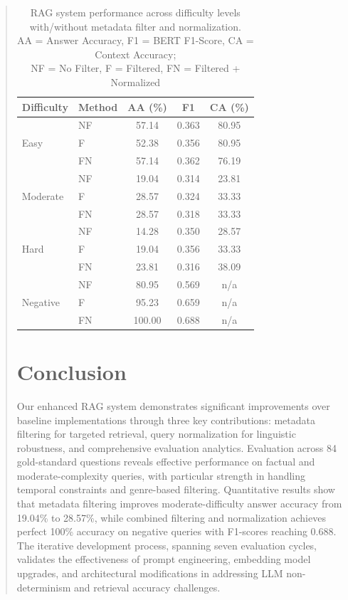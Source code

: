 \documentclass[11pt]{article}
\begin{document}
\begin{abstract}
\begin{table}[!t]
\centering
\small
\begin{tabularx}{\columnwidth}{lXccc}
\toprule
\textbf{Difficulty} & \textbf{Method} & \textbf{AA (\%)} & \textbf{F1} & \textbf{CA (\%)} \\
\midrule
& NF & 57.14 & 0.363 & 80.95 \\
Easy & F & 52.38 & 0.356 & 80.95 \\
& FN & 57.14 & 0.362 & 76.19 \\
\midrule
& NF & 19.04 & 0.314 & 23.81 \\
Moderate & F & 28.57 & 0.324 & 33.33 \\
& FN & 28.57 & 0.318 & 33.33 \\
\midrule
& NF & 14.28 & 0.350 & 28.57 \\
Hard & F & 19.04 & 0.356 & 33.33 \\
& FN & 23.81 & 0.316 & 38.09 \\
\midrule
& NF & 80.95 & 0.569 & n/a \\
Negative & F & 95.23 & 0.659 & n/a \\
& FN & 100.00 & 0.688 & n/a \\
\bottomrule
\end{tabularx}
\caption{RAG system performance across difficulty levels with/without metadata filter and normalization.\\
AA = Answer Accuracy, F1 = BERT F1-Score, CA = Context Accuracy;\\
NF = No Filter, F = Filtered, FN = Filtered + Normalized}
\label{tab:performance_metrics}
\end{table}

\section{Conclusion}

Our enhanced RAG system demonstrates significant improvements over baseline implementations through three key contributions: metadata filtering for targeted retrieval, query normalization for linguistic robustness, and comprehensive evaluation analytics. Evaluation across 84 gold-standard questions reveals effective performance on factual and moderate-complexity queries, with particular strength in handling temporal constraints and genre-based filtering. Quantitative results show that metadata filtering improves moderate-difficulty answer accuracy from 19.04\% to 28.57\%, while combined filtering and normalization achieves perfect 100\% accuracy on negative queries with F1-scores reaching 0.688. The iterative development process, spanning seven evaluation cycles, validates the effectiveness of prompt engineering, embedding model upgrades, and architectural modifications in addressing LLM non-determinism and retrieval accuracy challenges.


\end{abstract}
\end{document}
